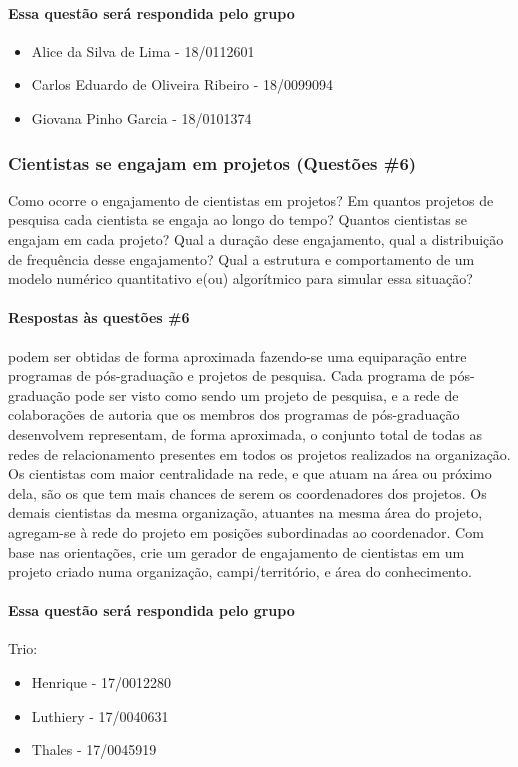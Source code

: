\paragraph{Essa questão será respondida pelo grupo}
\begin{itemize}
    \item Alice da Silva de Lima - 18/0112601
    \item Carlos Eduardo de Oliveira Ribeiro - 18/0099094
    \item Giovana Pinho Garcia - 18/0101374
\end{itemize}

\subsubsection{Cientistas se engajam em projetos (Questões \#6)} Como ocorre o engajamento de cientistas em projetos? Em quantos projetos de pesquisa cada cientista se engaja ao longo do tempo? Quantos cientistas se engajam em cada projeto? Qual a duração dese engajamento, qual a distribuição de frequência desse engajamento? Qual a estrutura e comportamento de um modelo numérico quantitativo e(ou) algorítmico para simular essa situação?

\paragraph{Respostas às questões \#6} podem ser obtidas de forma aproximada fazendo-se uma equiparação entre programas de pós-graduação e projetos de pesquisa. Cada programa de pós-graduação pode ser visto como sendo um projeto de pesquisa, e a rede de colaborações de autoria que os membros dos programas de pós-graduação desenvolvem representam, de forma aproximada, o conjunto total de todas as redes de relacionamento presentes em todos os  projetos realizados na organização. Os cientistas com maior centralidade na rede, e que atuam na área ou próximo dela, são os que tem mais chances de serem os coordenadores dos projetos. Os demais cientistas da mesma organização, atuantes na mesma área do projeto, agregam-se à rede do projeto em posições subordinadas ao coordenador.
Com base nas orientações, crie um gerador de engajamento de cientistas em um projeto criado numa organização, campi/território, e área do conhecimento.

\paragraph{Essa questão será respondida pelo grupo} 
Trio:
\begin{itemize}
    \item Henrique - 17/0012280
    \item Luthiery - 17/0040631
    \item Thales - 17/0045919
\end{itemize}


